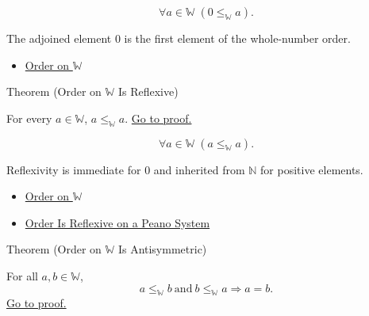 \begin{remark*}
\[
\forall a\in\mathbb{W}\;(0\leq_{\mathbb{W}}a).
\]
\end{remark*}

\begin{remark*}[Interpretation]
The adjoined element $0$ is the first element of the whole-number order.
\end{remark*}

\begin{dependencies}
\begin{itemize}
  \item \hyperref[def:order-on-w]{Order on $\mathbb{W}$}
\end{itemize}
\end{dependencies}

\begin{theorembox}{Theorem (Order on \texorpdfstring{$\mathbb{W}$}{W} Is Reflexive)}
\begin{theorem}
\label{thm:order-on-w-reflexive}
For every $a\in\mathbb{W}$, $a\leq_{\mathbb{W}}a$.
\hyperref[prf:order-on-w-reflexive]{Go to proof.}
\end{theorem}
\end{theorembox}

\begin{remark*}
\[
\forall a\in\mathbb{W}\;(a\leq_{\mathbb{W}}a).
\]
\end{remark*}

\begin{remark*}[Interpretation]
Reflexivity is immediate for $0$ and inherited from $\mathbb{N}$ for positive
elements.
\end{remark*}

\begin{dependencies}
\begin{itemize}
  \item \hyperref[def:order-on-w]{Order on $\mathbb{W}$}
  \item \hyperref[thm:order-reflexive-on-peano-system]{Order Is Reflexive on a Peano System}
\end{itemize}
\end{dependencies}

\begin{theorembox}{Theorem (Order on \texorpdfstring{$\mathbb{W}$}{W} Is Antisymmetric)}
\begin{theorem}
\label{thm:order-on-w-antisymmetric}
For all $a,b\in\mathbb{W}$,
\[
a\leq_{\mathbb{W}}b\ \text{and}\ b\leq_{\mathbb{W}}a
\Longrightarrow a=b.
\]
\hyperref[prf:order-on-w-antisymmetric]{Go to proof.}
\end{theorem}
\end{theorembox}

